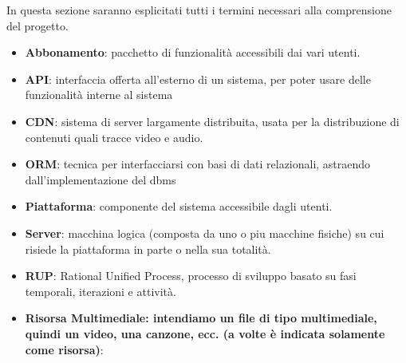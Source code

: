 In questa sezione saranno esplicitati tutti i termini necessari alla comprensione del progetto.

\begin{itemize}
	\item \textbf{Abbonamento}: pacchetto di funzionalità accessibili dai vari utenti.
	\item \textbf{API}: interfaccia offerta all'esterno di un sistema, per poter usare delle funzionalità interne al sistema
	\item \textbf{CDN}: sistema di server largamente distribuita, usata per la distribuzione di contenuti quali tracce video e audio.
	\item \textbf{ORM}: tecnica per interfacciarsi con basi di dati relazionali, astraendo dall'implementazione del dbms
	\item \textbf{Piattaforma}: componente del sistema accessibile dagli utenti.
	\item \textbf{Server}: macchina logica (composta da uno o piu macchine fisiche) su cui risiede la piattaforma in parte o nella sua totalità.
	\item \textbf{RUP}: Rational Unified Process, processo di sviluppo basato su fasi temporali, iterazioni e attività.
	\item \textbf{Risorsa Multimediale: intendiamo un file di tipo multimediale, quindi un video, una canzone, ecc. (a volte è indicata solamente come risorsa)}:
\end{itemize}